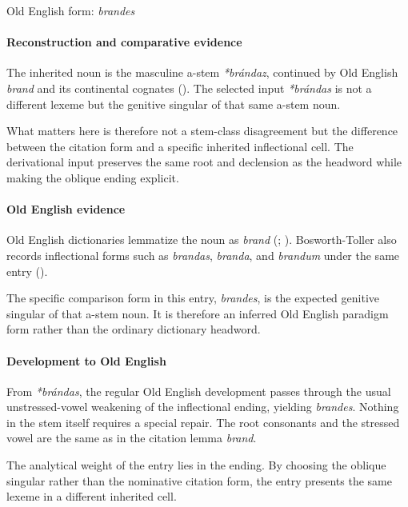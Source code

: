 \documentclass[
  british,
  a4paper,
]{article}
\begin{document}
Old English form: \emph{brandes}

\paragraph{Reconstruction and comparative
evidence}\label{reconstruction-and-comparative-evidence-5}

The inherited noun is the masculine a-stem \emph{*brándaz}, continued by
Old English \emph{brand} and its continental cognates
(). The selected input
\emph{*brándas} is not a different lexeme but the genitive singular of
that same a-stem noun.

What matters here is therefore not a stem-class disagreement but the
difference between the citation form and a specific inherited
inflectional cell. The derivational input preserves the same root and
declension as the headword while making the oblique ending explicit.

\paragraph{Old English evidence}\label{old-english-evidence-5}

Old English dictionaries lemmatize the noun as \emph{brand}
(;
).
Bosworth-Toller also records inflectional forms such as \emph{brandas},
\emph{branda}, and \emph{brandum} under the same entry
().

The specific comparison form in this entry, \emph{brandes}, is the
expected genitive singular of that a-stem noun. It is therefore an
inferred Old English paradigm form rather than the ordinary dictionary
headword.

\paragraph{Development to Old
English}\label{development-to-old-english-5}

From \emph{*brándas}, the regular Old English development passes through
the usual unstressed-vowel weakening of the inflectional ending,
yielding \emph{brandes}. Nothing in the stem itself requires a special
repair. The root consonants and the stressed vowel are the same as in
the citation lemma \emph{brand}.

The analytical weight of the entry lies in the ending. By choosing the
oblique singular rather than the nominative citation form, the entry
presents the same lexeme in a different inherited cell.
\end{document}
